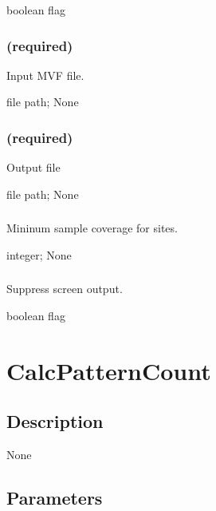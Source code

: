 \documentclass[letterpaper,11pt,english]{sphinxmanual}
\begin{document}
 boolean flag


\subsubsection{ (required)}
\label{\detokenize{prog_desc:id57}}
 Input MVF file.

 file path;  None


\subsubsection{ (required)}
\label{\detokenize{prog_desc:id58}}
 Output file

 file path;  None


\subsubsection{}
\label{\detokenize{prog_desc:id59}}
 Mininum sample coverage for sites.

 integer;  None


\subsubsection{}
\label{\detokenize{prog_desc:id60}}
 Suppress screen output.

 boolean flag


\section{CalcPatternCount}
\label{\detokenize{prog_desc:calcpatterncount}}

\subsection{Description}
\label{\detokenize{prog_desc:id61}}
None


\subsection{Parameters}
\label{\detokenize{prog_desc:id62}}
\end{document}

